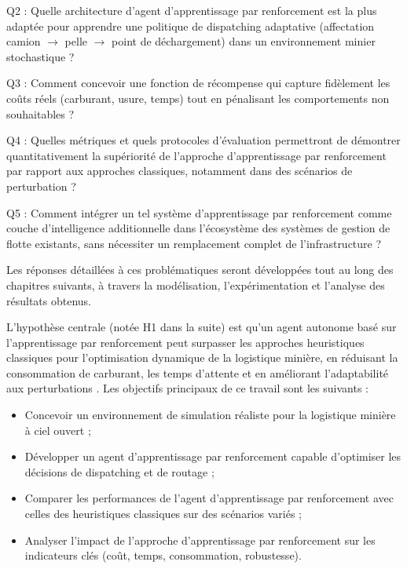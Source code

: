 \documentclass[11pt,a4paper]{report}
\begin{document}
    Q2 : Quelle architecture d'agent d'apprentissage par renforcement est la plus adaptée pour apprendre une politique de dispatching adaptative (affectation camion $\to$ pelle $\to$ point de déchargement) dans un environnement minier stochastique ?

    Q3 : Comment concevoir une fonction de récompense qui capture fidèlement les coûts réels (carburant, usure, temps) tout en pénalisant les comportements non souhaitables ?

    Q4 : Quelles métriques et quels protocoles d'évaluation permettront de démontrer quantitativement la supériorité de l'approche d'apprentissage par renforcement par rapport aux approches classiques, notamment dans des scénarios de perturbation ?

    Q5 : Comment intégrer un tel système d'apprentissage par renforcement comme couche d'intelligence additionnelle dans l'écosystème des systèmes de gestion de flotte existants, sans nécessiter un remplacement complet de l'infrastructure ?

Les réponses détaillées à ces problématiques seront développées tout au long des chapitres suivants, à travers la modélisation, l'expérimentation et l'analyse des résultats obtenus.

L’hypothèse centrale (notée H1 dans la suite) est qu’un agent autonome basé sur l’apprentissage par renforcement peut surpasser les approches heuristiques classiques pour l’optimisation dynamique de la logistique minière, en réduisant la consommation de carburant, les temps d’attente et en améliorant l’adaptabilité aux perturbations \cite{Szatmári2025, WZeng2022, MohammadrezaNazari2018}. Les objectifs principaux de ce travail sont les suivants :
\begin{itemize}
    \item Concevoir un environnement de simulation réaliste pour la logistique minière à ciel ouvert ;
    \item Développer un agent d’apprentissage par renforcement capable d’optimiser les décisions de dispatching et de routage ;
    \item Comparer les performances de l’agent d'apprentissage par renforcement avec celles des heuristiques classiques sur des scénarios variés ;
    \item Analyser l’impact de l’approche d'apprentissage par renforcement sur les indicateurs clés (coût, temps, consommation, robustesse).
\end{itemize}
\end{document}
